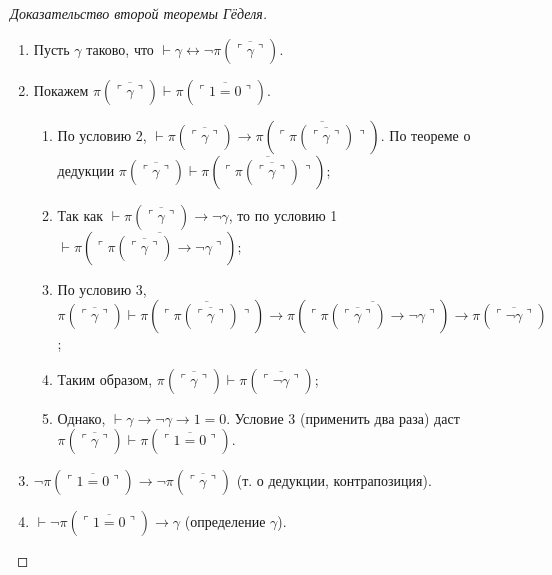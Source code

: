 \begin{proof}
[Доказательство второй теоремы Гёделя]

\begin{enumerate}
\item Пусть $\gamma$ таково, что $\vdash \gamma \leftrightarrow \neg\pi(\overline{\ulcorner\gamma\urcorner})$.
\item Покажем $\pi(\overline{\ulcorner\gamma\urcorner})\vdash \pi(\overline{\ulcorner 1=0\urcorner})$.

\begin{enumerate}
\item По условию 2, $\vdash \pi(\overline{\ulcorner\gamma\urcorner}) \rightarrow \pi(\overline{\ulcorner\pi(\overline{\ulcorner\gamma\urcorner})\urcorner})$.
По теореме о дедукции $\pi(\overline{\ulcorner\gamma\urcorner})\vdash \pi(\overline{\ulcorner\pi(\overline{\ulcorner\gamma\urcorner})\urcorner})$;

\item Так как $\vdash \pi(\overline{\ulcorner\gamma\urcorner})\rightarrow\neg\gamma$, то
по условию 1 $\vdash \pi(\overline{\ulcorner\pi(\overline{\ulcorner\gamma\urcorner})\rightarrow\neg\gamma\urcorner})$;

\item По условию 3, $\pi(\overline{\ulcorner\gamma\urcorner})\vdash \pi(\overline{\ulcorner\pi(\overline{\ulcorner\gamma\urcorner})\urcorner})
\rightarrow \pi(\overline{\ulcorner\pi(\overline{\ulcorner\gamma\urcorner})\rightarrow\neg\gamma\urcorner})\rightarrow
\pi(\overline{\ulcorner\neg\gamma\urcorner})$;

\item Таким образом, $\pi(\overline{\ulcorner\gamma\urcorner})\vdash\pi(\overline{\ulcorner\neg\gamma\urcorner})$;

\item Однако, $\vdash \gamma\rightarrow\neg\gamma\rightarrow 1=0$. Условие 3 (применить два раза) даст $\pi(\overline{\ulcorner\gamma\urcorner})\vdash \pi(\overline{\ulcorner 1=0 \urcorner})$.
\end{enumerate}

\item $\neg\pi(\overline{\ulcorner 1=0 \urcorner})\rightarrow\neg\pi(\overline{\ulcorner\gamma\urcorner})$ (т. о дедукции, контрапозиция).
\item $\vdash \neg\pi(\overline{\ulcorner 1=0 \urcorner})\rightarrow\gamma$ (определение $\gamma$).
\end{enumerate}
\end{proof}
